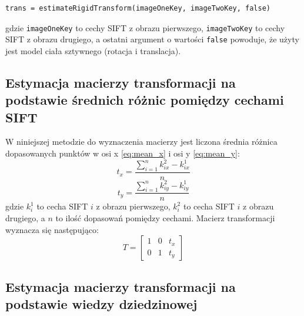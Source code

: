 \begin{verbatim}
trans = estimateRigidTransform(imageOneKey, imageTwoKey, false)
\end{verbatim}

gdzie \texttt{imageOneKey} to cechy SIFT z obrazu pierwszego, \texttt{imageTwoKey} to cechy SIFT z obrazu drugiego, a ostatni argument o wartości \texttt{false} powoduje, że użyty jest model ciała sztywnego (rotacja i translacja).

\subsection{Estymacja macierzy transformacji na podstawie średnich różnic pomiędzy cechami SIFT}
\label{sec:proponowane_algorytmy:srednie_roznice}

W niniejszej metodzie do wyznaczenia macierzy jest liczona średnia różnica dopasowanych punktów w osi x \ref{eq:mean_x} i osi y \ref{eq:mean_y}:
\begin{equation}
t_x = \frac{\sum_{i=1}^{n} k_{ix}^{2} - k_{ix}^{1}}{n}
\label{eq:mean_x}
\end{equation}
\begin{equation}
t_y = \frac{\sum_{i=1}^{n} k_{iy}^{2} - k_{iy}^{1}}{n}
\label{eq:mean_y}
\end{equation}
gdzie $k_i^{1}$ to cecha SIFT $i$ z obrazu pierwszego, $k_i^{2}$ to cecha SIFT $i$ z obrazu drugiego, a $n$ to ilość dopasowań pomiędzy cechami. Macierz transformacji wyznacza się następująco:
\begin{equation}
T = \begin{bmatrix}
  1 & 0 & t_x \\
  0 & 1 & t_y
\end{bmatrix}
\end{equation}

\subsection{Estymacja macierzy transformacji na podstawie wiedzy dziedzinowej}
\label{sec:proponowane_algorytmy:wiedza_dziedzinowa_trans}

